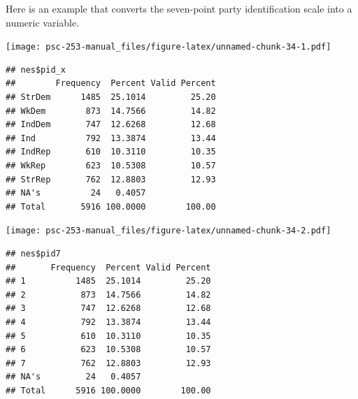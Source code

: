 \documentclass[
]{book}
\newenvironment{Shaded}{\begin{snugshade}}{\end{snugshade}}
\newcommand{\CommentTok}[1]{\textcolor[rgb]{0.56,0.35,0.01}{\textit{#1}}}
\newcommand{\FunctionTok}[1]{\textcolor[rgb]{0.00,0.00,0.00}{#1}}
\newcommand{\NormalTok}[1]{#1}
\newcommand{\OtherTok}[1]{\textcolor[rgb]{0.56,0.35,0.01}{#1}}
\newcommand{\SpecialCharTok}[1]{\textcolor[rgb]{0.00,0.00,0.00}{#1}}
\begin{document}
\begin{Shaded}
\end{Shaded}

Here is an example that converts the seven-point party identification scale into a numeric variable.

\begin{Shaded}
\end{Shaded}

\texttt{[image: psc-253-manual\_files/figure-latex/unnamed-chunk-34-1.pdf]}

\begin{verbatim}
## nes$pid_x 
##        Frequency  Percent Valid Percent
## StrDem      1485  25.1014         25.20
## WkDem        873  14.7566         14.82
## IndDem       747  12.6268         12.68
## Ind          792  13.3874         13.44
## IndRep       610  10.3110         10.35
## WkRep        623  10.5308         10.57
## StrRep       762  12.8803         12.93
## NA's          24   0.4057              
## Total       5916 100.0000        100.00
\end{verbatim}

\begin{Shaded}
\end{Shaded}

\texttt{[image: psc-253-manual\_files/figure-latex/unnamed-chunk-34-2.pdf]}

\begin{verbatim}
## nes$pid7 
##       Frequency  Percent Valid Percent
## 1          1485  25.1014         25.20
## 2           873  14.7566         14.82
## 3           747  12.6268         12.68
## 4           792  13.3874         13.44
## 5           610  10.3110         10.35
## 6           623  10.5308         10.57
## 7           762  12.8803         12.93
## NA's         24   0.4057              
## Total      5916 100.0000        100.00
\end{verbatim}
\end{document}
